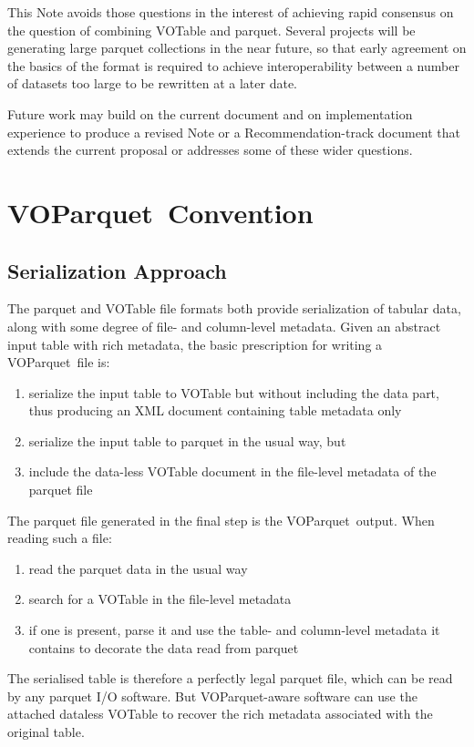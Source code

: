 \documentclass[11pt,a4paper]{ivoa}
\newcommand{\voparquet}{VOParquet}
\begin{document}
This Note avoids those questions in the interest of achieving rapid
consensus on the question of combining VOTable and parquet.
Several projects will be generating large parquet collections
in the near future, so that early agreement on the basics of the format
is required to achieve interoperability between a number of
datasets too large to be rewritten at a later date.

Future work may build on the current document and on implementation
experience to produce a revised Note or a Recommendation-track document
that extends the current proposal or addresses
some of these wider questions.

\section{\voparquet\ Convention}
\label{sec:serialization}

\subsection{Serialization Approach}

The parquet and VOTable file formats both provide serialization
of tabular data, along with some degree of file- and column-level metadata.
Given an abstract input table with rich metadata,
the basic prescription for writing a \voparquet\ file is:
\begin{enumerate}
\item serialize the input table to VOTable but without including the data part,
      thus producing an XML document containing table metadata only
\item serialize the input table to parquet in the usual way, but
\item include the data-less VOTable document in the file-level metadata
      of the parquet file
\end{enumerate}
The parquet file generated in the final step is the \voparquet\ output.
When reading such a file:
\begin{enumerate}
\item read the parquet data in the usual way
\item search for a VOTable in the file-level metadata
\item if one is present, parse it and use the table- and column-level
      metadata it contains to decorate the data read from parquet
\end{enumerate}

The serialised table is therefore a perfectly legal parquet file,
which can be read by any parquet I/O software.
But \voparquet-aware software can use the attached dataless VOTable to recover
the rich metadata associated with the original table.
\end{document}

